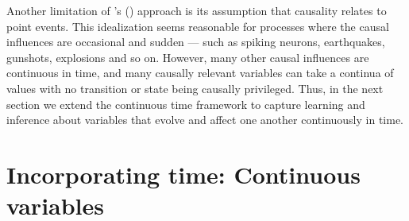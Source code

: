 \documentclass{cambridge7A}%
\newcommand{\ttodo}[2][]{\vspace{0.1cm} \hfil \todo[caption={\textbf{TG}}, size=\footnotesize, color = orange, inline, #1]{#2}}
\def\citeapos#1{\citeauthor{#1}'s (\citeyear{#1})}
\begin{document}
Another limitation of \citeapos{bramley2018time} approach is its assumption that causality relates to point events.  This idealization seems reasonable for processes where the causal influences are occasional and sudden --- such as spiking neurons, earthquakes, gunshots, explosions and so on.  However, many other causal influences are continuous in time, and many causally relevant variables can take a continua of values with no transition or state being causally privileged.  Thus, in the next section we extend the continuous time framework to capture learning and inference about variables that evolve and affect one another continuously in time.







\section{Incorporating time: Continuous variables}\label{section:ctcv}
\end{document}
